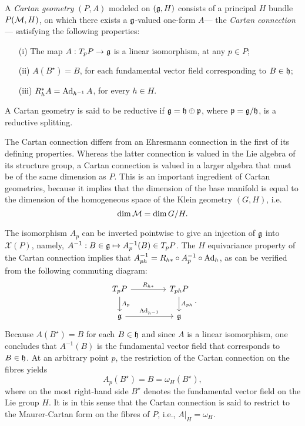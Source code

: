 \documentclass[
final,
11pt,
a4paper,
DIV=11,
headinclude=true,
footinclude=false,
bibliography=totoc,
twoside=true,  %
BCOR=5mm
]{scrbook}
\begin{document}
\begin{definition}
A \emph{Cartan geometry} $(P,A)$ modeled on $(\mathfrak{g},H)$ consists 
of a principal $H$ bundle $P(\mathcal{M},H)$, on which there exists a
$\mathfrak{g}$-valued one-form $A$--- the \emph{Cartan connection}--- 
satisfying the following properties:
\begin{itemize}
  \item[(i)] The map $A : T_p P \to \mathfrak{g}$ is a linear 
    isomorphism, at any $p \in P$;
  \item[(ii)] $A(B^\star) = B$, for each fundamental vector field 
    corresponding to $B \in \mathfrak{h}$;
  \item[(iii)] $R_h^*A = \operatorname{Ad}_{h^{-1}} A$, for every $h \in H$.
\end{itemize}
A Cartan geometry is said to be reductive if $\mathfrak{g} = \mathfrak{h} 
\oplus \mathfrak{p}$, where $\mathfrak{p} = \mathfrak{g}/\mathfrak{h}$, is a reductive 
splitting.
\end{definition}

The Cartan connection differs from an Ehresmann connection in the 
first of its defining properties. Whereas the latter connection 
is valued in the Lie algebra of its structure group, a Cartan 
connection is valued in a larger algebra that must be of the same 
dimension as $P$. This is an important ingredient of Cartan 
geometries, because it implies that the dimension of the base 
manifold is equal to the dimension of the homogeneous space of 
the Klein geometry $(G,H)$, i.e.
\begin{equation*}
  \dim \mathcal{M} = \dim G/H.
\end{equation*}

The isomorphism $A_p$ can be inverted pointwise to give an 
injection of $\mathfrak{g}$ into $\mathscr{X}(P)$, namely, $A^{-1} 
: B \in \mathfrak{g} \mapsto A_p^{-1}(B) \in T_p P$. The $H$ 
equivariance property of the Cartan connection implies that 
$A_{ph}^{-1} = R_{h*} \circ A_p^{-1} \circ \operatorname{Ad}_h$, as can be 
verified from the following commuting diagram:
\begin{equation*}
\begin{tikzcd}[
  column sep=1.5cm
  ]
  T_pP
    \arrow[r, "R_{h*}"]
    \arrow[d, "A_p"]  &
  T_{ph}P
    \arrow[d, "A_{ph}"]
  \\
  \mf{g}
    \arrow[r, "\Ad_{h^{-1}}"] &
  \mf{g}
\end{tikzcd}%
.
\end{equation*}
Because $A(B^\star) = B$ for each $B \in \mathfrak{h}$ and since
$A$ is a linear isomorphism, one concludes that $A^{-1}(B)$ is 
the fundamental vector field that corresponds to $B \in \mathfrak{h}$.  
At an arbitrary point $p$, the restriction of the Cartan 
connection on the fibres yields
\begin{equation*}
  A_p(B^\star) = B = \omega_H(B^\star),
\end{equation*}
where on the most right-hand side $B^\star$ denotes the 
fundamental vector field on the Lie group $H$. It is in this 
sense that the Cartan connection is said to restrict to the 
Maurer-Cartan form on the fibres of $P$, i.e., $A|_H = \omega_H$.
\end{document}
